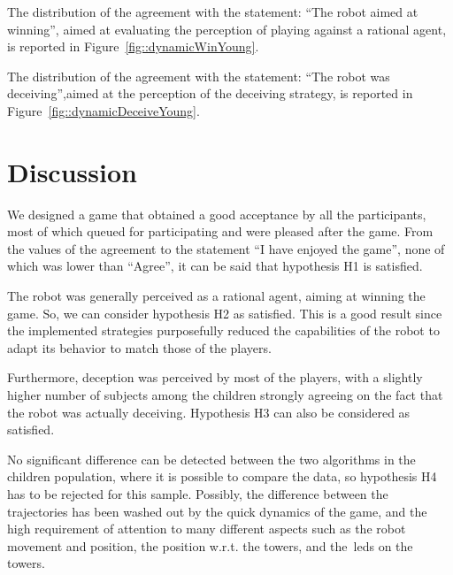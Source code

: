 The distribution of the agreement with the statement: ``The robot aimed at winning'', aimed at evaluating the perception of playing against a rational agent, is reported in Figure~\ref{fig::dynamicWinYoung}.

The distribution of the agreement with the statement: ``The robot was deceiving'',aimed at the perception of the deceiving strategy, is reported in Figure~\ref{fig::dynamicDeceiveYoung}.

\section{Discussion}
\label{sec:deception_discussion}
We designed a game that obtained a good acceptance by all the participants, most of which queued for participating and were pleased after the game. From the values of the agreement to the statement ``I have enjoyed the game'', none of which was lower than ``Agree'', it can be said that hypothesis H1 is satisfied.  


The robot was generally perceived as a rational agent, aiming at winning the game. So, we can consider hypothesis H2 as satisfied. This is a good result since the implemented strategies purposefully reduced the capabilities of the robot to adapt its behavior to match those of the players.

Furthermore, deception was perceived by most of the players, with a slightly higher number of subjects among the children strongly agreeing on the fact that the robot was actually deceiving. Hypothesis H3 can also be considered as satisfied.

No significant difference can be detected between the two algorithms in the children population, where it is possible to compare the data, so hypothesis H4 has to be rejected for this sample. Possibly, the difference between the trajectories has been washed out by the quick dynamics of the game, and the high requirement of attention to many different aspects such as the robot movement and position, the position w.r.t. the towers, and the~\gls{led}s on the towers.




